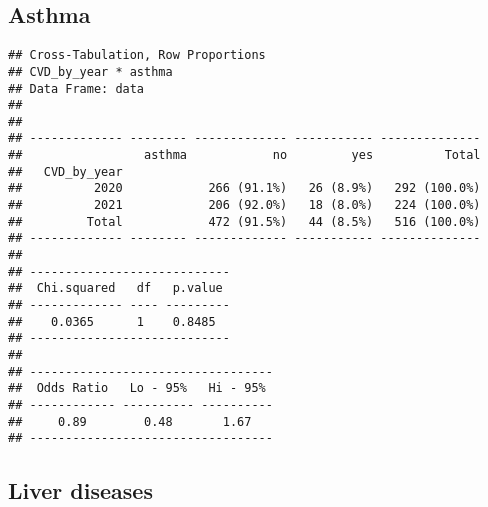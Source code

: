 \documentclass[
]{article}
\newenvironment{Shaded}{\begin{snugshade}}{\end{snugshade}}
\newcommand{\AttributeTok}[1]{\textcolor[rgb]{0.13,0.29,0.53}{#1}}
\newcommand{\ConstantTok}[1]{\textcolor[rgb]{0.56,0.35,0.01}{#1}}
\newcommand{\FunctionTok}[1]{\textcolor[rgb]{0.13,0.29,0.53}{\textbf{#1}}}
\newcommand{\NormalTok}[1]{#1}
\newcommand{\SpecialCharTok}[1]{\textcolor[rgb]{0.81,0.36,0.00}{\textbf{#1}}}
\newcommand{\StringTok}[1]{\textcolor[rgb]{0.31,0.60,0.02}{#1}}
\begin{document}
\hypertarget{asthma}{%
\subsection{Asthma}\label{asthma}}

\begin{Shaded}
\end{Shaded}

\begin{verbatim}
## Cross-Tabulation, Row Proportions  
## CVD_by_year * asthma  
## Data Frame: data  
## 
## 
## ------------- -------- ------------- ----------- --------------
##                 asthma            no         yes          Total
##   CVD_by_year                                                  
##          2020            266 (91.1%)   26 (8.9%)   292 (100.0%)
##          2021            206 (92.0%)   18 (8.0%)   224 (100.0%)
##         Total            472 (91.5%)   44 (8.5%)   516 (100.0%)
## ------------- -------- ------------- ----------- --------------
## 
## ----------------------------
##  Chi.squared   df   p.value 
## ------------- ---- ---------
##    0.0365      1    0.8485  
## ----------------------------
## 
## ----------------------------------
##  Odds Ratio   Lo - 95%   Hi - 95% 
## ------------ ---------- ----------
##     0.89        0.48       1.67   
## ----------------------------------
\end{verbatim}

\hypertarget{liver-diseases}{%
\subsection{Liver diseases}\label{liver-diseases}}

\begin{Shaded}
\end{Shaded}
\end{document}
